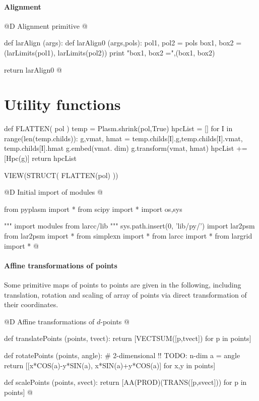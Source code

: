\documentclass[11pt,oneside]{article}	%
\begin{document}
\paragraph{Alignment}
@D Alignment primitive
@{def larAlign (args):
	def larAlign0 (args,pols):
		pol1, pol2 = pols
		box1, box2 = (larLimits(pol1), larLimits(pol2))
		print "box1, box2 =",(box1, box2)
		
	return larAlign0
@}

\appendix
\section{Utility functions}



def FLATTEN( pol )
	temp = Plasm.shrink(pol,True)
	hpcList = []
	for I in range(len(temp.childs)):			
		g,vmat, hmat = temp.childs[I].g,temp.childs[I].vmat, temp.childs[I].hmat
		g.embed(vmat. dim)
		g.transform(vmat, hmat)
		hpcList += [Hpc(g)]
	return hpcList
	
VIEW(STRUCT( FLATTEN(pol) ))


@D Initial import of modules
@{from pyplasm import *
from scipy import *
import os,sys

""" import modules from larcc/lib """
sys.path.insert(0, 'lib/py/')
import lar2psm
from lar2psm import *
from simplexn import *
from larcc import *
from largrid import *
@}


\paragraph{Affine transformations of points} Some primitive maps of points to points are given in the following, including translation, rotation and scaling of array of points via direct transformation of their coordinates.

@D Affine transformations of $d$-points
@{def translatePoints (points, tvect):
	return [VECTSUM([p,tvect]) for p in points]

def rotatePoints (points, angle):		# 2-dimensional !! TODO: n-dim
	a = angle
	return [[x*COS(a)-y*SIN(a), x*SIN(a)+y*COS(a)] for x,y in points]

def scalePoints (points, svect):
	return [AA(PROD)(TRANS([p,svect])) for p in points]
@}
\end{document}
